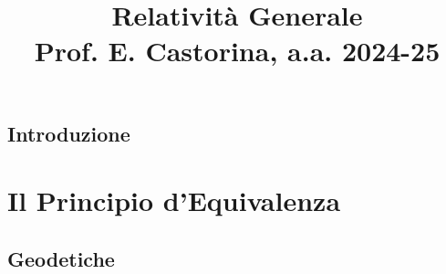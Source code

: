 \documentclass[a4paper, 12pt, openany]{book}
\title{\Huge\textbf{Relatività Generale} \\ \large Prof. E. Castorina, a.a. 2024-25}
\begin{document}
\frontmatter

\maketitle

\tableofcontents
\pagestyle{indice}

\mainmatter

\chapter*{Introduzione}
\pagestyle{introd}



\part{Il Principio d'Equivalenza}
\pagestyle{body}

\chapter{Geodetiche}

\end{document}
